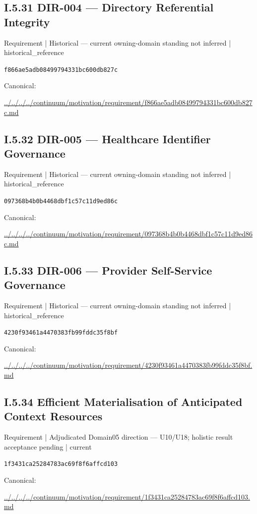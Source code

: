 \documentclass[10pt,a4paper]{article}
\begin{document}
\subsection*{I.5.31 DIR-004 — Directory Referential Integrity}
{\small Requirement | Historical — current owning-domain standing not inferred | historical\_reference}\par
\texttt{f866ae5adb08499794331bc600db827c}\par
Canonical: \par
{\footnotesize\url{../../../../continuum/motivation/requirement/f866ae5adb08499794331bc600db827c.md}}\par
\subsection*{I.5.32 DIR-005 — Healthcare Identifier Governance}
{\small Requirement | Historical — current owning-domain standing not inferred | historical\_reference}\par
\texttt{097368b4b0b4468dbf1c57c11d9ed86c}\par
Canonical: \par
{\footnotesize\url{../../../../continuum/motivation/requirement/097368b4b0b4468dbf1c57c11d9ed86c.md}}\par
\subsection*{I.5.33 DIR-006 — Provider Self-Service Governance}
{\small Requirement | Historical — current owning-domain standing not inferred | historical\_reference}\par
\texttt{4230f93461a4470383fb99fddc35f8bf}\par
Canonical: \par
{\footnotesize\url{../../../../continuum/motivation/requirement/4230f93461a4470383fb99fddc35f8bf.md}}\par
\subsection*{I.5.34 Efficient Materialisation of Anticipated Context Resources}
{\small Requirement | Adjudicated Domain05 direction — U10/U18; holistic result acceptance pending | current}\par
\texttt{1f3431ca25284783ac69f8f6affcd103}\par
Canonical: \par
{\footnotesize\url{../../../../continuum/motivation/requirement/1f3431ca25284783ac69f8f6affcd103.md}}\par
\end{document}
